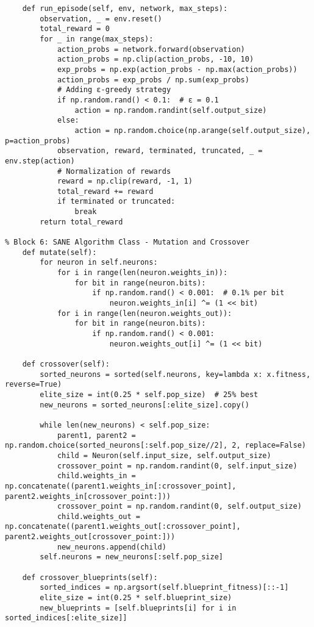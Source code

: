 \documentclass[a4paper,12pt]{article}
\begin{document}
\begin{lstlisting}
    def run_episode(self, env, network, max_steps):
        observation, _ = env.reset()
        total_reward = 0
        for _ in range(max_steps):
            action_probs = network.forward(observation)
            action_probs = np.clip(action_probs, -10, 10)
            exp_probs = np.exp(action_probs - np.max(action_probs))
            action_probs = exp_probs / np.sum(exp_probs)
            # Adding ε-greedy strategy
            if np.random.rand() < 0.1:  # ε = 0.1
                action = np.random.randint(self.output_size)
            else:
                action = np.random.choice(np.arange(self.output_size), p=action_probs)
            observation, reward, terminated, truncated, _ = env.step(action)
            # Normalization of rewards
            reward = np.clip(reward, -1, 1)
            total_reward += reward
            if terminated or truncated:
                break
        return total_reward

% Block 6: SANE Algorithm Class - Mutation and Crossover
    def mutate(self):
        for neuron in self.neurons:
            for i in range(len(neuron.weights_in)):
                for bit in range(neuron.bits):
                    if np.random.rand() < 0.001:  # 0.1% per bit
                        neuron.weights_in[i] ^= (1 << bit)
            for i in range(len(neuron.weights_out)):
                for bit in range(neuron.bits):
                    if np.random.rand() < 0.001:
                        neuron.weights_out[i] ^= (1 << bit)

    def crossover(self):
        sorted_neurons = sorted(self.neurons, key=lambda x: x.fitness, reverse=True)
        elite_size = int(0.25 * self.pop_size)  # 25% best
        new_neurons = sorted_neurons[:elite_size].copy()

        while len(new_neurons) < self.pop_size:
            parent1, parent2 = np.random.choice(sorted_neurons[:self.pop_size//2], 2, replace=False)
            child = Neuron(self.input_size, self.output_size)
            crossover_point = np.random.randint(0, self.input_size)
            child.weights_in = np.concatenate((parent1.weights_in[:crossover_point], parent2.weights_in[crossover_point:]))
            crossover_point = np.random.randint(0, self.output_size)
            child.weights_out = np.concatenate((parent1.weights_out[:crossover_point], parent2.weights_out[crossover_point:]))
            new_neurons.append(child)
        self.neurons = new_neurons[:self.pop_size]

    def crossover_blueprints(self):
        sorted_indices = np.argsort(self.blueprint_fitness)[::-1]
        elite_size = int(0.25 * self.blueprint_size)
        new_blueprints = [self.blueprints[i] for i in sorted_indices[:elite_size]]


\end{lstlisting}
\end{document}
